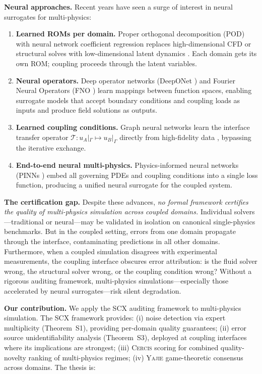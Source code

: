 \documentclass[11pt,a4paper]{article}
\theoremstyle{definition}
\newcommand{\Yajie}{\textsc{Yajie}}
\newcommand{\Cercis}{\textsc{Cercis}}
\newcommand{\SCX}{\textsc{SCX}}
\newcommand{\ThmSCXNoise}{Theorem~S1}
\newcommand{\ThmSCXHonest}{Theorem~S3}
\begin{document}
\textbf{Neural approaches.} Recent years have seen a surge of interest in neural surrogates for multi-physics:

\begin{enumerate}[label=(\roman*)]
    \item \textbf{Learned ROMs per domain.} Proper orthogonal decomposition (POD) with neural network coefficient regression replaces high-dimensional CFD or structural solves with low-dimensional latent dynamics \cite{Hesthaven2016,Fresca2021}. Each domain gets its own ROM; coupling proceeds through the latent variables.
    \item \textbf{Neural operators.} Deep operator networks (DeepONet \cite{Lu2021}) and Fourier Neural Operators (FNO \cite{Li2021}) learn mappings between function spaces, enabling surrogate models that accept boundary conditions and coupling loads as inputs and produce field solutions as outputs.
    \item \textbf{Learned coupling conditions.} Graph neural networks learn the interface transfer operator $\mathcal{T}: u_A|_\Gamma \mapsto u_B|_\Gamma$ directly from high-fidelity data \cite{Gao2022}, bypassing the iterative exchange.
    \item \textbf{End-to-end neural multi-physics.} Physics-informed neural networks (PINNs \cite{Raissi2019}) embed all governing PDEs and coupling conditions into a single loss function, producing a unified neural surrogate for the coupled system.
\end{enumerate}

\textbf{The certification gap.} Despite these advances, \textit{no formal framework certifies the quality of multi-physics simulation across coupled domains.} Individual solvers---traditional or neural---may be validated in isolation on canonical single-physics benchmarks. But in the coupled setting, errors from one domain propagate through the interface, contaminating predictions in all other domains. Furthermore, when a coupled simulation disagrees with experimental measurements, the coupling interface obscures error attribution: is the fluid solver wrong, the structural solver wrong, or the coupling condition wrong? Without a rigorous auditing framework, multi-physics simulations---especially those accelerated by neural surrogates---risk silent degradation.

\textbf{Our contribution.} We apply the \SCX{} auditing framework \cite{SCX2025} to multi-physics simulation. The \SCX{} framework provides: (i) noise detection via expert multiplicity (\ThmSCXNoise), providing per-domain quality guarantees; (ii) error source unidentifiability analysis (\ThmSCXHonest), deployed at coupling interfaces where its implications are strongest; (iii) \Cercis{} scoring for combined quality-novelty ranking of multi-physics regimes; (iv) \Yajie{} game-theoretic consensus across domains. The thesis is:
\end{document}
